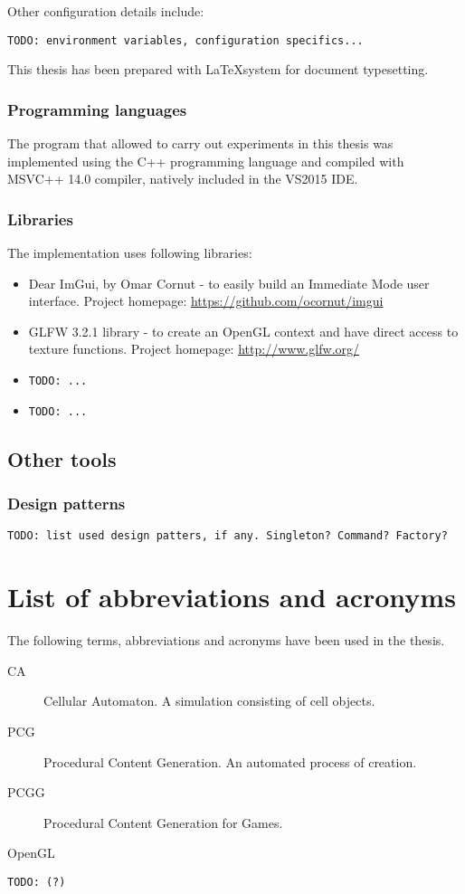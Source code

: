 \documentclass[12pt]{report}
\newcommand{\todo}[1]{}
\renewcommand{\todo}[1]{{\color{red} \par \noindent \footnotesize \texttt{TODO: {#1} }}}
\begin{document}
Other configuration details include: \todo{environment variables, configuration specifics...} 

This thesis has been prepared with \LaTeX\space system for document typesetting.

 
\subsubsection{Programming languages} 

The program that allowed to carry out experiments in this thesis was implemented using the C++ programming language and compiled with MSVC++ 14.0 compiler, natively included in the VS2015 IDE.  

\subsubsection{Libraries} 

The implementation uses following libraries:
\begin{itemize}
	\item Dear ImGui, by Omar Cornut - to easily build an Immediate Mode user interface. Project homepage:  \url{https://github.com/ocornut/imgui}
	\item GLFW 3.2.1 library - to create an OpenGL context and have direct access to texture functions. Project homepage: \url{http://www.glfw.org/}
	\item \todo{...}
	\item \todo{...}
\end{itemize}  
 

\subsection{Other tools }
\subsubsection{Design patterns} 
\todo{list used design patters, if any. Singleton? Command? Factory?}
 
\section{List of abbreviations and acronyms} 

The following terms, abbreviations and acronyms have been used in the thesis.

\begin{description}
	\item[CA] Cellular Automaton. A simulation consisting of cell objects.
	\item[PCG] Procedural Content Generation. An automated process of creation.
	\item[PCGG]	Procedural Content Generation for Games.
	\item[OpenGL] 
	
\end{description}
\todo{(?)}
\end{document}
